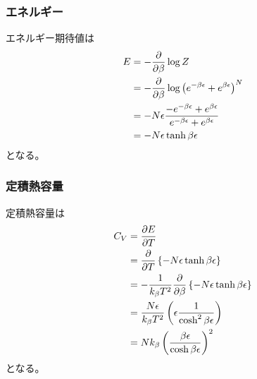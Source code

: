 \documentclass{jsarticle}  %
\numberwithin{equation}{section} %
\numberwithin{figure}{section}
\begin{document}
\subsubsection{エネルギー}
    エネルギー期待値は
    \begin{align}
        E &= -\frac{\partial }{\partial \beta} \log Z \notag \\
        &= -\frac{\partial }{\partial \beta} \log \left( e^{-\beta \epsilon} + e^{\beta \epsilon} \right)^N \notag \\
        &= -N \epsilon \frac{-e^{-\beta \epsilon} + e^{\beta \epsilon} }{e^{-\beta \epsilon} + e^{\beta \epsilon} } \notag \\
        &= -N \epsilon \tanh \beta \epsilon
    \end{align}
    となる。
\subsubsection{定積熱容量}
    定積熱容量は
    \begin{align}
        C_V &= \frac{\partial E}{\partial T} \\
        &= \frac{\partial}{\partial T} \left\{ -N \epsilon \tanh \beta \epsilon \right\} \notag \\
        &= - \frac{1}{k_\beta T^2} \frac{\partial }{\partial \beta} \left\{ -N \epsilon \tanh \beta \epsilon \right\} \notag \\
        &= \frac{N \epsilon}{k_\beta T^2} \left( \epsilon \frac{1}{\cosh^2 \beta \epsilon} \right) \notag \\
        &= Nk_\beta \left( \frac{\beta \epsilon}{\cosh \beta \epsilon} \right)^2
    \end{align}
    となる。
\end{document}
